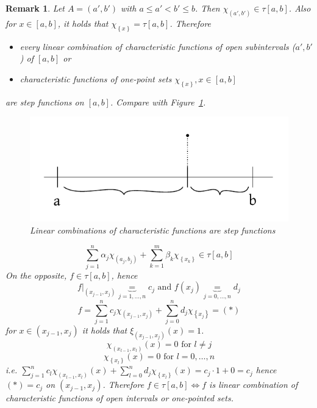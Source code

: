 \documentclass{article}
\newtheorem{remark}{Remark}  \numberwithin{remark}{section}
\newcommand{\set}[1]{\left\{#1\right\}}
\begin{document}
\begin{remark}
  Let $A = (a', b')$ with $a \leq a' < b' \leq b$.
  Then $\chi_{(a',b')} \in \tau[a,b]$. Also for $x \in [a,b]$, it holds that $\chi_{\set{x}} = \tau[a,b]$.
  Therefore
  \begin{itemize}
    \item every linear combination of characteristic functions of open subintervals ($a',b'$) of $[a,b]$ or
    \item characteristic functions of one-point sets $\chi_{\set{x}}, x \in [a,b]$
  \end{itemize}
  are step functions on $[a,b]$. Compare with Figure~\ref{img:linchar}.

  \begin{figure}[t]
    \begin{center}
      \includegraphics{img/13b_char_function_as_step_function.pdf}
      \caption{Linear combinations of characteristic functions are step functions}
      \label{img:linchar}
    \end{center}
  \end{figure}

  \[ \sum_{j=1}^n \alpha_j \chi_{(a_j,b_j)} + \sum_{k=1}^m \beta_k \chi_{\set{x_k}} \in \tau[a,b] \]
  On the opposite, $f \in \tau[a,b]$, hence
  \[ f|_{(x_{j-1},x_j)} \underbrace{=}_{j=1,\dots,n} c_j \text{ and } f(x_j) \underbrace{=}_{j=0,\dots,n} d_j \]
  \[ f = \sum_{j=1}^n c_j \chi_{(x_{j-1},x_j)} + \sum_{j=0}^n d_j \chi_{\set{x_j}} = (*) \]
  for $x \in (x_{j-1}, x_j)$ it holds that $\xi_{(x_{j-1},x_j)}(x) = 1$.
  \[ \chi_{(x_{l-1},x_l)}(x) = 0 \text{ for } l \neq j \]
  \[ \chi_{\set{x_l}}(x) = 0 \text{ for } l = 0, \dots, n \]
  i.e. $\sum_{j=1}^n c_l \chi_{(x_{l-1},x_l)}(x) + \sum_{l=0}^n d_j \chi_{\set{x_l}}(x) = c_j \cdot 1 + 0 = c_j$
  hence $(*) = c_j$ on $(x_{j-1}, x_j)$. Therefore $f \in \tau[a,b] \iff f$ is linear combination of characteristic functions
  of open intervals or one-pointed sets.
\end{remark}
\end{document}
